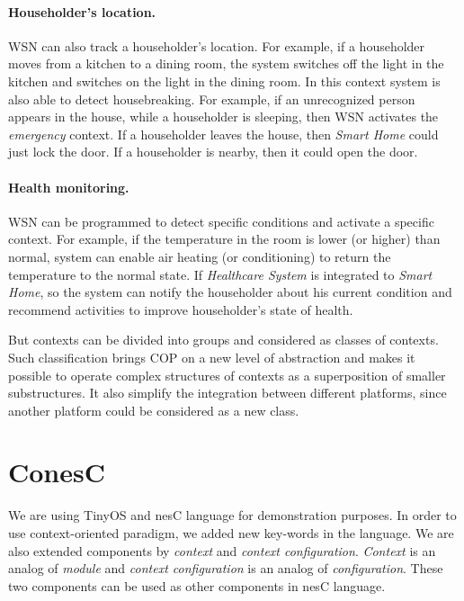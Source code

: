 \documentclass{ubicomp-ext}
\begin{document}
\paragraph{Householder's location.} WSN can also track a householder's location. For example, if a householder moves from a kitchen to a dining room, the system switches off the light in the kitchen and switches on the light in the dining room. In this context system is also able to detect housebreaking. For example, if an unrecognized person appears in the house, while a householder is sleeping, then WSN activates the \textit{emergency} context. If a householder leaves the house, then \textit{Smart Home} could just lock the door. If a householder is nearby, then it could open the door.

\paragraph{Health monitoring.} WSN can be programmed to detect specific conditions and activate a specific context. For example, if the temperature in the room is lower (or higher) than normal, system can enable air heating (or conditioning) to return the temperature to the normal state. If \textit{Healthcare System} is integrated to \textit{Smart Home}, so the system can notify the householder about his current condition and recommend activities to improve householder's state of health.

But contexts can be divided into groups and considered as classes of contexts. Such classification brings COP on a new level of abstraction and makes it possible to operate complex structures of contexts as a superposition of smaller substructures. It also simplify the integration between different platforms, since another platform could be considered as a new class.

\section{ConesC}
We are using TinyOS and nesC language for demonstration purposes. In order to use context-oriented paradigm, we added new key-words in the language. We are also extended components by \textit{context} and \textit{context configuration}. \textit{Context} is an analog of \textit{module} and \textit{context configuration} is an analog of \textit{configuration}. These two components can be used as other components in nesC language.
\end{document}

